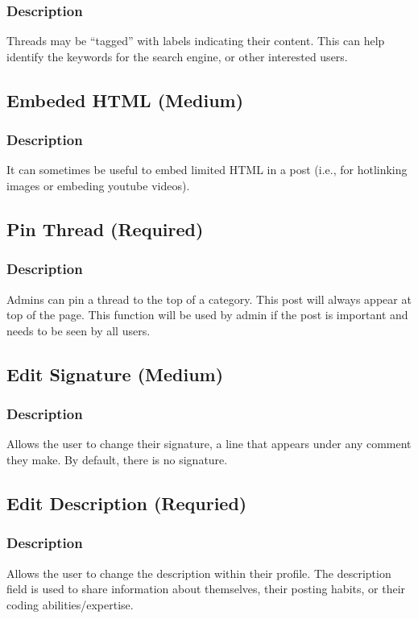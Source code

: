 \documentclass[12pt]{scrartcl}
\begin{document}
\subsubsection{Description}

Threads may be ``tagged'' with labels indicating their content. This can help identify the keywords for the search engine, or other interested users.

\subsection{Embeded HTML (Medium)}
\subsubsection{Description}

It can sometimes be useful to embed limited HTML in a post (i.e., for hotlinking images or embeding youtube videos).

\subsection{Pin Thread (Required)}
\subsubsection{Description}
Admins can pin a thread to the top of a category. This post will always appear at top of the page.
This function will be used by admin if the post is important and needs to be seen by all users.

\subsection{Edit Signature (Medium)}
\subsubsection{Description}
Allows the user to change their signature, a line that appears under any comment they make. By default, there is no signature.

\subsection{Edit Description (Requried)}
\subsubsection{Description}
Allows the user to change the description within their profile.
The description field is used to share information about themselves, their posting habits, or their coding abilities/expertise.
\end{document}
